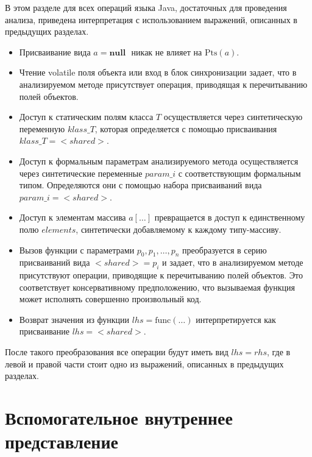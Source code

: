 \documentclass[14pt,titlepage]{extarticle}
\newcommand{\NULL}{\textbf{null }}
\newcommand{\Pts}[1]{\textrm{Pts}(#1)}
\newcommand{\eng}[1]{{\English#1}}
\let\oldsection\section
\renewcommand{\section}{\newpage\oldsection}
\newcommand{\java}{\eng{Java}\xspace}
\begin{document}
        В этом разделе для всех операций языка \java, достаточных для
        проведения анализа, приведена интерпретация с использованием выражений,
        описанных в предыдущих разделах.
        \begin{itemize}
          \item Присваивание вида $a = \NULL$ никак не влияет на $\Pts{a}$.
          \item Чтение \eng{volatile} поля объекта или вход в
                блок синхронизации задает, что в анализируемом методе
                присутствует операция, приводящая к перечитыванию полей
                объектов.
          \item Доступ к статическим полям класса $T$ осуществляется через
                синтетическую переменную $klass\_T$, которая определяется с
                помощью присваивания $klass\_T = {<}shared{>}$.
          \item Доступ к формальным параметрам анализируемого метода
                осуществляется через синтетические переменные $param\_i$ с
                соответствующим формальным типом.
                Определяются они с помощью набора присваиваний вида
                $param\_i = {<}shared{>}$.
          \item Доступ к элементам массива $a[\ldots]$ превращается в доступ к
                единственному полю $elements$, синтетически добавляемому к
                каждому типу-массиву.
          \item Вызов функции с параметрами $p_0, p_1, \ldots, p_n$
                преобразуется в серию присваиваний вида ${<}shared{>} = p_i$ и
                задает, что в анализируемом методе присутствуют операции,
                приводящие к перечитыванию полей объектов. Это соответствует
                консервативному предположению, что вызываемая функция может
                исполнять совершенно произвольный код.
          \item Возврат значения из функции $lhs = \textrm{func}(\ldots)$
                интерпретируется как присваивание $lhs = {<}shared{>}$.
        \end{itemize}
        После такого преобразования все операции будут иметь вид $lhs = rhs$,
        где в левой и правой части стоит одно из выражений, описанных в
        предыдущих разделах.

  \section{Вспомогательное внутреннее представление}
    \label{section:analysis_aux_ir}
\end{document}

